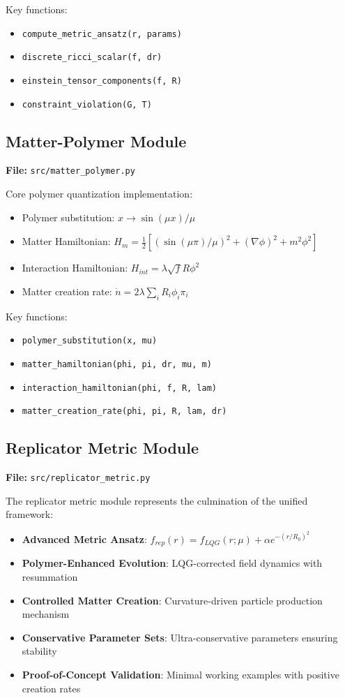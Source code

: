 \documentclass[11pt]{article}
\begin{document}
Key functions:
\begin{itemize}
\item \texttt{compute\_metric\_ansatz(r, params)}
\item \texttt{discrete\_ricci\_scalar(f, dr)}
\item \texttt{einstein\_tensor\_components(f, R)}
\item \texttt{constraint\_violation(G, T)}
\end{itemize}

\subsection{Matter-Polymer Module}

\textbf{File:} \texttt{src/matter\_polymer.py}

Core polymer quantization implementation:
\begin{itemize}
\item Polymer substitution: $x \to \sin(\mu x)/\mu$
\item Matter Hamiltonian: $H_m = \frac{1}{2}[(\sin(\mu\pi)/\mu)^2 + (\nabla\phi)^2 + m^2\phi^2]$
\item Interaction Hamiltonian: $H_{int} = \lambda\sqrt{f}R\phi^2$
\item Matter creation rate: $\dot{n} = 2\lambda \sum_i R_i \phi_i \pi_i$
\end{itemize}

Key functions:
\begin{itemize}
\item \texttt{polymer\_substitution(x, mu)}
\item \texttt{matter\_hamiltonian(phi, pi, dr, mu, m)}
\item \texttt{interaction\_hamiltonian(phi, f, R, lam)}
\item \texttt{matter\_creation\_rate(phi, pi, R, lam, dr)}
\end{itemize}

\subsection{Replicator Metric Module}

\textbf{File:} \texttt{src/replicator\_metric.py}

The replicator metric module represents the culmination of the unified framework:
\begin{itemize}
\item \textbf{Advanced Metric Ansatz}: $f_{rep}(r) = f_{LQG}(r;\mu) + \alpha e^{-(r/R_0)^2}$
\item \textbf{Polymer-Enhanced Evolution}: LQG-corrected field dynamics with resummation
\item \textbf{Controlled Matter Creation}: Curvature-driven particle production mechanism
\item \textbf{Conservative Parameter Sets}: Ultra-conservative parameters ensuring stability
\item \textbf{Proof-of-Concept Validation}: Minimal working examples with positive creation rates
\end{itemize}
\end{document}
